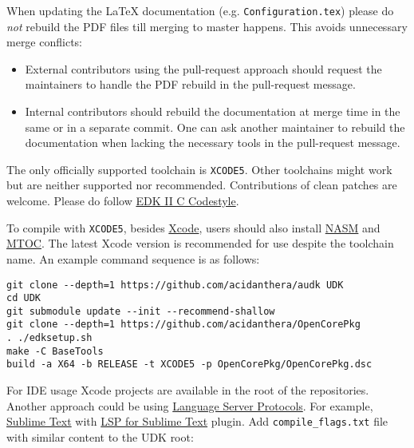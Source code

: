 \documentclass[]{article}
\providecommand{\tightlist}{%
  \setlength{\itemsep}{0pt}\setlength{\parskip}{0pt}}
\begin{document}
When updating the LaTeX documentation (e.g. \texttt{Configuration.tex}) please
do \textit{not} rebuild the PDF files till merging to master happens. This avoids
unnecessary merge conflicts:
\begin{itemize}
\tightlist
\item External contributors using the pull-request approach should request
  the maintainers to handle the PDF rebuild in the pull-request message.
\item Internal contributors should rebuild the documentation at merge time
  in the same or in a separate commit. One can ask another maintainer to
  rebuild the documentation when lacking the necessary tools
  in the pull-request message.
\end{itemize}

The only officially supported toolchain is \texttt{XCODE5}. Other toolchains
might work but are neither supported nor recommended. Contributions of clean
patches are welcome. Please do follow
\href{https://github.com/tianocore/tianocore.github.io/wiki/Code-Style-C}{EDK II C Codestyle}.

To compile with \texttt{XCODE5}, besides \href{https://developer.apple.com/xcode}{Xcode},
users should also install \href{https://www.nasm.us}{NASM} and
\href{https://github.com/acidanthera/ocbuild/tree/master/external}{MTOC}.
The latest Xcode version is recommended for use despite the toolchain name.
An example command sequence is as follows:

\begin{lstlisting}[caption=Compilation Commands, label=compile, style=ocbash]
git clone --depth=1 https://github.com/acidanthera/audk UDK
cd UDK
git submodule update --init --recommend-shallow
git clone --depth=1 https://github.com/acidanthera/OpenCorePkg
. ./edksetup.sh
make -C BaseTools
build -a X64 -b RELEASE -t XCODE5 -p OpenCorePkg/OpenCorePkg.dsc
\end{lstlisting}

For IDE usage Xcode projects are available in the root of the repositories. Another
approach could be using \href{https://microsoft.github.io/language-server-protocol}{Language Server Protocols}. For example, \href{https://www.sublimetext.com}{Sublime Text} with
\href{https://lsp.sublimetext.io}{LSP for Sublime Text} plugin.
Add \texttt{compile\_flags.txt} file with similar content to the UDK root:
\end{document}
